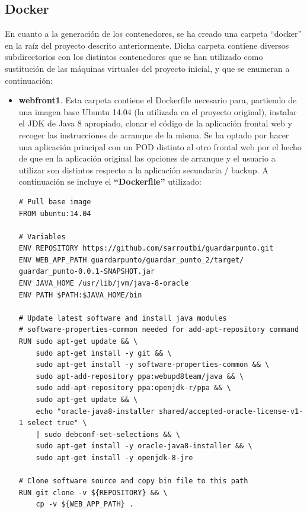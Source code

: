 \documentclass[12pt,spanish]{article}
\begin{document}
\subsection{Docker}
\label{subsec:docker}

En cuanto a la generación de los contenedores, se ha creado una carpeta ``docker'' en la raíz del proyecto descrito anteriormente. Dicha carpeta contiene diversos subdirectorios con los distintos contenedores que se han utilizado como sustitución de las máquinas virtuales del proyecto inicial, y que se enumeran a continuación:

\begin{itemize}
\item{\textbf{webfront1}}. Esta carpeta contiene el Dockerfile necesario para, partiendo de una imagen base Ubuntu 14.04 (la utilizada en el proyecto original), instalar el JDK de Java 8 apropiado, clonar el código de la aplicación frontal web y recoger las instrucciones de arranque de la misma. Se ha optado por hacer una aplicación principal con un POD distinto al otro frontal web por el hecho de que en la aplicación original las opciones de arranque y el usuario a utilizar son distintos respecto a la aplicación secundaria / backup.
A continuación se incluye el \textbf{``Dockerfile''} utilizado:
\begin{verbatim}
# Pull base image
FROM ubuntu:14.04

# Variables
ENV REPOSITORY https://github.com/sarroutbi/guardarpunto.git
ENV WEB_APP_PATH guardarpunto/guardar_punto_2/target/
guardar_punto-0.0.1-SNAPSHOT.jar
ENV JAVA_HOME /usr/lib/jvm/java-8-oracle
ENV PATH $PATH:$JAVA_HOME/bin

# Update latest software and install java modules
# software-properties-common needed for add-apt-repository command
RUN sudo apt-get update && \
    sudo apt-get install -y git && \
    sudo apt-get install -y software-properties-common && \
    sudo apt-add-repository ppa:webupd8team/java && \
    sudo add-apt-repository ppa:openjdk-r/ppa && \
    sudo apt-get update && \
    echo "oracle-java8-installer shared/accepted-oracle-license-v1-1 select true" \
    | sudo debconf-set-selections && \
    sudo apt-get install -y oracle-java8-installer && \
    sudo apt-get install -y openjdk-8-jre

# Clone software source and copy bin file to this path
RUN git clone -v ${REPOSITORY} && \
    cp -v ${WEB_APP_PATH} .


\end{verbatim}
\end{itemize}
\end{document}
